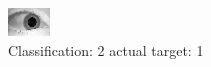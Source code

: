 \begin{figure}[h!]
\begin{center}
\includegraphics[width=0.60\columnwidth]{figures/ID1566_class_2_target_1.png}
\end{center}
\caption{ Classification: 2 actual target: 1}
\label{fig:ID1566_class_2_target_1}
\end{figure}
